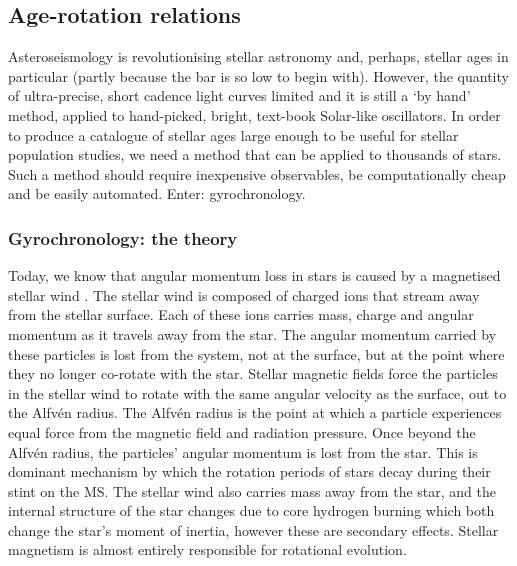 \subsection{Age-rotation relations}

Asteroseismology is revolutionising stellar astronomy and, perhaps, stellar
ages in particular (partly because the bar is so low to begin with).
However, the quantity of ultra-precise, short cadence light curves limited and
it is still a `by hand' method, applied to hand-picked, bright, text-book
Solar-like oscillators.
In order to produce a catalogue of stellar ages large enough to be useful for
stellar population studies, we need a method that can be applied to thousands
of stars.
Such a method should require inexpensive observables, be computationally cheap
and be easily automated.
Enter: gyrochronology.

\subsubsection{Gyrochronology: the theory}

Today, we know that angular momentum loss in stars is caused by a magnetised
stellar wind \citep{Schatzman1962, Weber1967, Mestel1984}.
The stellar wind is composed of charged ions that stream away from the stellar
surface.
Each of these ions carries mass, charge and angular momentum as it travels
away from the star.
The angular momentum carried by these particles is lost from the system, not
at the surface, but at the point where they no longer co-rotate with the star.
Stellar magnetic fields force the particles in the stellar wind to rotate with
the same angular velocity as the surface, out to the Alfv{\'e}n radius.
The Alfv{\'e}n radius is the point at which a particle experiences equal force
from the magnetic field and radiation pressure.
Once beyond the Alfv{\'e}n radius, the particles' angular momentum is lost
from the star.
This is dominant mechanism by which the rotation periods of stars decay during
their stint on the MS.
The stellar wind also carries mass away from the star, and the internal
structure of the star changes due to core hydrogen burning which both change
the star's moment of inertia, however these are secondary effects.
Stellar magnetism is almost entirely responsible for rotational evolution.

